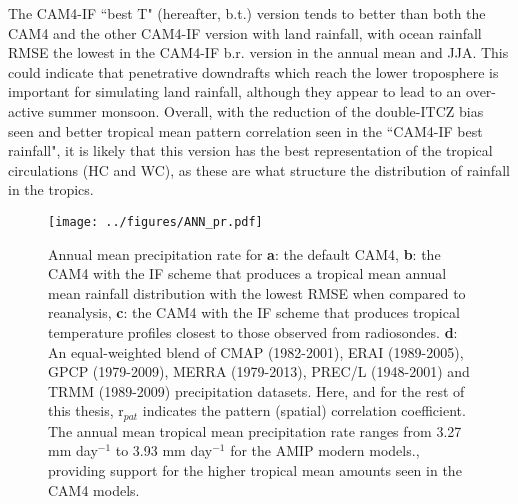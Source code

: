 \documentclass[letterpaper,12pt,titlepage,oneside,final]{book}
\begin{document}
The CAM4-IF ``best T" (hereafter, b.t.) version tends to better than both the CAM4 and the other CAM4-IF version with land rainfall, with ocean rainfall RMSE the lowest in the CAM4-IF b.r. version in the annual mean and JJA. This could indicate that penetrative downdrafts which reach the lower troposphere is important for simulating land rainfall, although they appear to lead to an over-active summer monsoon. Overall, with the reduction of the double-ITCZ bias seen and better tropical mean pattern correlation seen in the ``CAM4-IF best rainfall", it is likely that this version has the best representation of the tropical circulations (HC and WC), as these are what structure the distribution of rainfall in the tropics.
\begin{figure}[H]
\centering
\noindent\texttt{[image: ../figures/ANN\_pr.pdf]}\hfill
\caption{Annual mean precipitation rate for \textbf{a}: the default CAM4, \textbf{b}: the CAM4 with the IF scheme that produces a tropical mean annual mean rainfall distribution with the lowest RMSE when compared to reanalysis, \textbf{c}: the CAM4 with the IF scheme that produces tropical temperature profiles closest to those observed from radiosondes. \textbf{d}: An equal-weighted blend of CMAP (1982-2001), ERAI (1989-2005), GPCP (1979-2009), MERRA (1979-2013), PREC/L (1948-2001) and TRMM (1989-2009) precipitation datasets. Here, and for the rest of this thesis, r$_{pat}$ indicates the pattern (spatial) correlation coefficient. The annual mean tropical mean precipitation rate ranges from 3.27 mm day$^{-1}$ to 3.93 mm day$^{-1}$  for the AMIP modern models., providing support for the higher tropical mean amounts seen in the CAM4 models.}
\label{fig:3.1}
\end{figure}
\newpage
\end{document}
